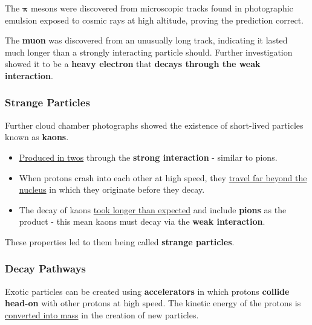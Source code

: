 The $\mathbf{\pi}$ mesons were discovered from microscopic tracks found in photographic emulsion exposed to cosmic rays at high altitude, proving the prediction correct.

The \textbf{muon} was discovered from an unusually long track, indicating it lasted much longer than a strongly interacting particle should. Further investigation showed it to be a \textbf{heavy electron} that \textbf{decays through the weak interaction}.

\subsubsection*{Strange Particles}

Further cloud chamber photographs showed the existence of short-lived particles known as \textbf{kaons}.
\begin{itemize}
    \item \underline{Produced in twos} through the \textbf{strong interaction} - similar to pions.
    \item When protons crash into each other at high speed, they \underline{travel far beyond the nucleus} in which they originate before they decay.
    \item The decay of kaons \underline{took longer than expected} and include \textbf{pions} as the product - this mean kaons must decay via the \textbf{weak interaction}.
\end{itemize}
These properties led to them being called \textbf{strange particles}.

\subsubsection*{Decay Pathways}

Exotic particles can be created using \textbf{accelerators} in which protons \textbf{collide head-on} with other protons at high speed. The kinetic energy of the protons is \underline{converted into mass} in the creation of new particles.

